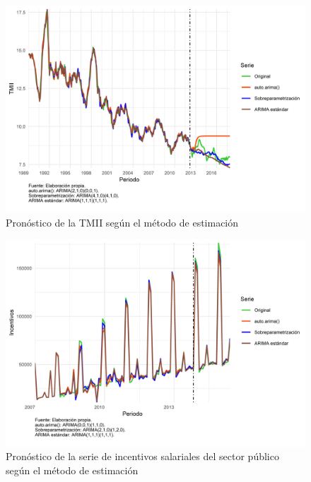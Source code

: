 \documentclass[
]{article}
\begin{document}
\begin{figure}[H]
\includegraphics[width=1\linewidth,height=1\textheight]{Tesis_files/figure-latex/pronostico_TMII-1} \caption{Pronóstico de la TMII según el método de estimación}\label{fig:pronostico_TMII}
\end{figure}

\begin{figure}[H]
\includegraphics[width=1\linewidth,height=1\textheight]{Tesis_files/figure-latex/pronostico_INCENTIVOS-1} \caption{Pronóstico de la serie de incentivos salariales del sector público según el método de estimación}\label{fig:pronostico_INCENTIVOS}
\end{figure}
\end{document}
